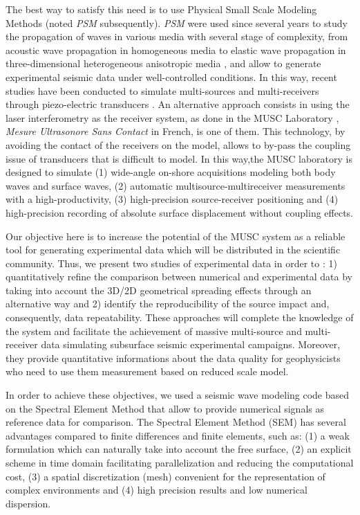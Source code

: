 \documentclass[manuscript,revised]{geophysics}
\newcommand{\psm}{\textit{PSM} }
\newcommand{\thrd}{three-dimensional }
\begin{document}
\noindent The best way to satisfy this need is to use Physical Small Scale Modeling Methods (noted \psm subsequently). \psm were used since several years to study the propagation of waves in various media with several stage of complexity, from acoustic wave propagation in homogeneous media to elastic wave propagation in \thrd heterogeneous anisotropic media \citep{Rieber_EWP_1936,Howes_SMS_1953,Hilterman_TDM_1970,French_MRP_1974,Bishop_LVM_1985,Pratt_FWI_1999,Favretto_NMT_2013,Sarkar_TPM_2003,Isaac_SMS_1999}, and allow to generate experimental seismic data under well-controlled conditions. In this way, recent studies have been conducted to simulate multi-sources and multi-receivers through piezo-electric transducers \citep{Wong_SPM_2009}. An alternative approach consists in using the laser interferometry as the receiver system, as done in the MUSC Laboratory \citep{Bretaudeau_SSA_2008b,Bretaudeau_SSM_2011,Bretaudeau_FWI_2013}, \textit{Mesure Ultrasonore Sans Contact} in French, is one of them. This technology, by avoiding the contact of the receivers on the model, allows to by-pass the coupling issue of transducers that is difficult to model. In this way,the MUSC laboratory is designed to simulate (1) wide-angle on-shore acquisitions modeling both body waves and surface waves, (2) automatic multisource-multireceiver measurements with a high-productivity, (3) high-precision source-receiver positioning and (4) high-precision recording of absolute surface displacement without coupling effects. 

\noindent Our objective here is to increase the potential of the MUSC system as a reliable tool for generating experimental data which will be distributed in the scientific community. 
\noindent Thus, we present two studies of experimental data in order to : 1) quantitatively refine the comparison between numerical and experimental data by taking into account the 3D/2D geometrical spreading effects through an alternative way and 2) identify the reproducibility of the source impact and, consequently, data repeatability. These approaches will complete the knowledge of the system and facilitate the achievement of massive multi-source and multi-receiver data simulating subsurface seismic experimental campaigns. Moreover, they provide quantitative informations about the data quality for geophysicists who need to use them measurement based on reduced scale model. 

\noindent In order to achieve these objectives, we used a seismic wave modeling code based on the Spectral Element Method \citep{Komatitsch_SEM_1998,Komatitsch_ISM_1999,Komatitsch_SEM_2005,Festa_PML_2005} that allow to provide numerical signals as reference data for comparison. The Spectral Element Method (SEM) has several advantages compared to finite differences and finite elements, such as: (1) a weak formulation which can naturally take into account the free surface, (2) an explicit scheme in time domain facilitating parallelization and reducing the computational cost, (3) a spatial discretization (mesh) convenient for the representation of complex environments and (4) high precision results and low numerical dispersion.
\end{document}

